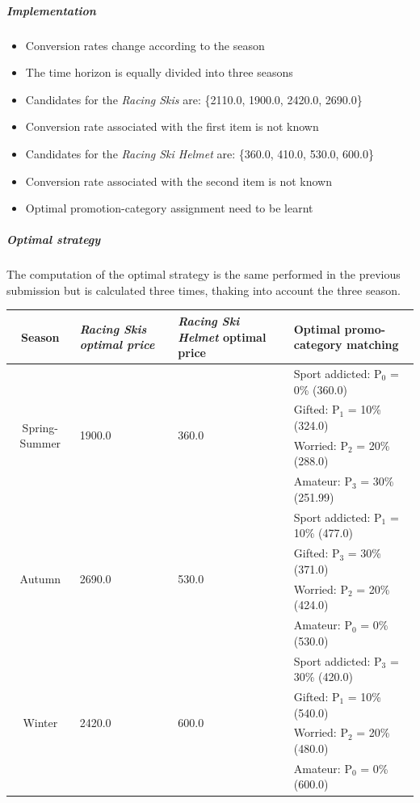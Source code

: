 \subparagraph{Implementation} 
\begin{itemize}
	\item Conversion rates change according to the season
	\item The time horizon is equally divided into three seasons
	\item Candidates for the \textit{Racing Skis} are: \{2110.0, 1900.0, 2420.0, 2690.0\}
	\item Conversion rate associated with the first item is not known
	\item Candidates for the \textit{Racing Ski Helmet} are: \{360.0, 410.0, 530.0, 600.0\}
	\item Conversion rate associated with the second item is not known
	\item Optimal promotion-category assignment need to be learnt
\end{itemize}
\subparagraph{Optimal strategy}
The computation of the optimal strategy is the same performed in the previous submission but is calculated three times, thaking into account the three season.
\begin{center}
	\begin{tabular}{|c|p{4cm}|p{4cm}|p{4cm}|} 
	\hline
	Season & \textit{Racing Skis optimal price} & \textit{Racing Ski Helmet} optimal price & Optimal promo-category matching \\ \hline
	\multirow{4}{*}{Spring-Summer} & \multirow{4}{*}{1900.0} & \multirow{4}{*}{360.0} & Sport addicted: P$_0$ = 0\% (360.0)  \\ 
								   & 					   &                      & Gifted: P$_1$ = 10\% (324.0)          \\ 
								   & 					   &                      & Worried: P$_2$ = 20\% (288.0)         \\
								   & 					   &                      & Amateur: P$_3$ = 30\% (251.99)         \\ \hline
	\multirow{4}{*}{Autumn} & \multirow{4}{*}{2690.0} & \multirow{4}{*}{530.0}  & Sport addicted: P$_1$ = 10\% (477.0)\\ 
								   & 					   &                      & Gifted: P$_3$ = 30\% (371.0)         \\ 
								   & 					   &                      & Worried: P$_2$ = 20\% (424.0)         \\
								   & 					   &                      & Amateur: P$_0$ = 0\% (530.0)         \\ \hline
	\multirow{4}{*}{Winter} & \multirow{4}{*}{2420.0} & \multirow{4}{*}{600.0}  & Sport addicted: P$_3$ = 30\% (420.0)\\ 
								   & 					   &                      & Gifted: P$_1$ = 10\% (540.0)         \\ 
								   & 					   &                      & Worried: P$_2$ = 20\% (480.0)         \\
								   & 					   &                      & Amateur: P$_0$ = 0\% (600.0)          \\ \hline
	\end{tabular}
\end{center}

